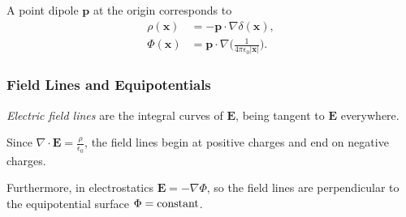 \documentclass[12pt]{article}
\begin{document}
A point dipole $\mathbf{p}$ at the origin corresponds to
\begin{align*}
	\rho(\mathbf{x}) &= - \mathbf{p} \cdot \nabla \delta(\mathbf{x}), \\
	\Phi(\mathbf{x}) &= \mathbf{p} \cdot \nabla \biggl( \frac{1}{4 \pi \epsilon_0 |\mathbf{x}|} \biggr).
\end{align*}

\subsubsection{Field Lines and Equipotentials}
\label{subsubsub:field_lines_and_equipotentials}

\emph{Electric field lines} are the integral curves of $\mathbf{E}$, being tangent to $\mathbf{E}$ everywhere.

Since $\nabla \cdot \mathbf{E} = \frac{\rho}{\epsilon_0}$, the field lines begin at positive charges and end on negative charges.

Furthermore, in electrostatics $\mathbf{E} = - \nabla \Phi$, so the field lines are perpendicular to the equipotential surface $\Phi = \rm{constant}$.
\end{document}
